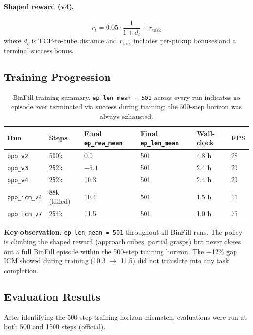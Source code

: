 \documentclass[11pt,letterpaper]{article}
\begin{document}
\paragraph{Shaped reward (v4).}
\[
r_t = 0.05 \cdot \frac{1}{1 + d_t} + r_\text{task}
\]
where $d_t$ is TCP-to-cube distance and $r_\text{task}$ includes per-pickup bonuses
and a terminal success bonus.

\subsection{Training Progression}

\begin{table}[H]
\centering
\begin{tabular}{llllll}
\toprule
\textbf{Run} & \textbf{Steps} & \textbf{Final \texttt{ep\_rew\_mean}} &
\textbf{Final \texttt{ep\_len\_mean}} & \textbf{Wall-clock} & \textbf{FPS} \\
\midrule
\texttt{ppo\_v2}     & 500k & 0.0   & 501 & 4.8 h & 28 \\
\texttt{ppo\_v3}     & 252k & $-5.1$ & 501 & 2.4 h & 29 \\
\texttt{ppo\_v4}     & 252k & 10.3  & 501 & 2.4 h & 29 \\
\texttt{ppo\_icm\_v4} & 88k (killed) & 10.4 & 501 & 1.5 h & 16 \\
\texttt{ppo\_icm\_v7} & 254k & 11.5 & 501 & 1.0 h & 75 \\
\bottomrule
\end{tabular}
\caption{BinFill training summary. \texttt{ep\_len\_mean = 501} across every run
indicates no episode ever terminated via success during training; the 500-step
horizon was always exhausted.}
\end{table}

\begin{finding}
\textbf{Key observation.} \texttt{ep\_len\_mean = 501} throughout all BinFill runs.
The policy is climbing the shaped reward (approach cubes, partial grasps) but
never closes out a full BinFill episode within the 500-step training horizon.
The +12\% gap ICM showed during training (10.3 $\to$ 11.5) did not translate
into any task completion.
\end{finding}

\subsection{Evaluation Results}

After identifying the 500-step training horizon mismatch, evaluations were run
at both 500 and 1500 steps (official).
\end{document}
